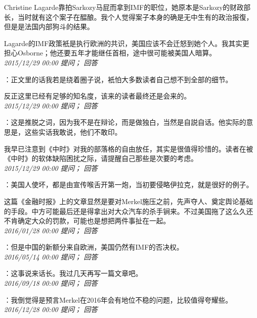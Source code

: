 \documentclass[twocolumn]{ctexart}
\begin{document}
Christine Lagarde靠拍Sarkozy马屁而拿到IMF的职位，她原本是Sarkozy的财政部长，当时就有这个案子在醖酿。我个人觉得案子本身的确是无中生有的政治报復，但是是法国内部狗斗的结果。

Lagarde的IMF政策衹是执行欧洲的共识，美国应该不会迁怒到她个人。我其实更担心Osborne；他还要五年才能继任首相，途中很可能被美国人暗算。\\

\textit{\hfill\noindent\small 2015/12/29 00:00 提问； 回答}

：正文里的话我若是绕着圈子说，衹怕大多数读者自己想不到全部的细节。

反正这里已经有足够的知名度，该来的读者最终还是会来的。\\

\textit{\hfill\noindent\small 2015/12/29 00:00 提问； 回答}

：这是推脱之词，因为我不是在辩论，而是做独白，当然是自説自话。他实际的意思是，这些实话我敢说，他们不敢印。

我早已注意到《中时》对我的部落格的自由放任，其实是很值得珍惜的。读者在被《中时》的软体缺陷困扰之际，请提醒自己那些是次要的考虑。\\

\textit{\hfill\noindent\small 2015/12/29 00:00 提问； 回答}

：美国人使坏，都是由宣传喉舌开第一炮，当初要侵略伊拉克，就是很好的例子。

这篇《金融时报》上的文章显然是要对Merkel施压之前，先声夺人、奠定舆论基础的手段。中方可能最后还是得拿出对大众汽车的杀手锏来。不过美国拖了这么久还不肯确定大众的罚款，可能也是想把两件事扯在一起。\\

\textit{\hfill\noindent\small 2016/01/28 00:00 提问； 回答}

：但是中国的新额分来自欧洲，美国仍然有IMF的否决权。\\

\textit{\hfill\noindent\small 2016/05/14 00:00 提问； 回答}

：这事说来话长。我过几天再写一篇文章吧。\\

\textit{\hfill\noindent\small 2016/09/18 00:00 提问； 回答}

：我倒觉得是预言Merkel在2016年会有地位不稳的问题，比较值得夸耀些。\\

\textit{\hfill\noindent\small 2016/12/28 00:00 提问； 回答}
\end{document}
